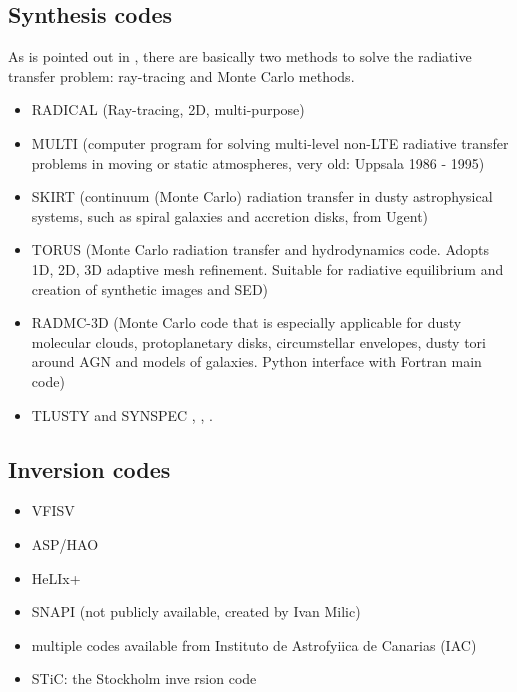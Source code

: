 \documentclass[../main/main.tex]{subfiles}
\begin{document}
\subsection{Synthesis codes}
As is pointed out in \cite{PinteChristophe2015CRT}, there are basically two methods to solve the radiative transfer problem: ray-tracing and Monte Carlo methods.

\begin{itemize}
\item RADICAL \cite{RADICAL}  (Ray-tracing, 2D, multi-purpose)
\item MULTI \cite{MULTI} \cite{Carlsson1986} (computer program for solving multi-level non-LTE radiative transfer problems in moving or static atmospheres, very old: Uppsala 1986 - 1995)
\item SKIRT \cite{Camps2015} (continuum (Monte Carlo) radiation transfer in dusty astrophysical systems, such as spiral galaxies and accretion disks, from Ugent)
\item TORUS \cite{Harries2019} (Monte Carlo radiation transfer and hydrodynamics code. Adopts 1D, 2D, 3D adaptive mesh refinement. Suitable for radiative equilibrium and creation of synthetic images and SED)
\item RADMC-3D \cite{RADMC3D} (Monte Carlo code that is especially applicable for dusty molecular clouds, protoplanetary disks, circumstellar envelopes, dusty tori around AGN and models of galaxies. Python interface with Fortran main code)
\item TLUSTY and SYNSPEC \cite{Hubeny2017}, \cite{Hubeny2017a}, \cite{Hubeny2017b}.
\end{itemize}

\subsection{Inversion codes}
\begin{itemize}
\item VFISV
\item ASP/HAO
\item HeLIx+
\item SNAPI (not publicly available, created by Ivan Milic)
\item multiple codes available from Instituto de Astrofyiica de Canarias (IAC)
\item STiC: the Stockholm inve rsion code
\end{itemize}
\end{document}
